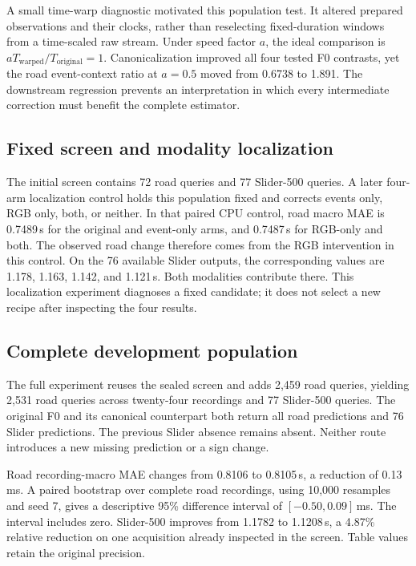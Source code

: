 A small time-warp diagnostic motivated this population test. It altered prepared observations and their clocks, rather than reselecting fixed-duration windows from a time-scaled raw stream. Under speed factor $a$, the ideal comparison is $aT_{\mathrm{warped}}/T_{\mathrm{original}}=1$. Canonicalization improved all four tested F0 contrasts, yet the road event-context ratio at $a=0.5$ moved from 0.6738 to 1.891. The downstream regression prevents an interpretation in which every intermediate correction must benefit the complete estimator. 

\subsection{Fixed screen and modality localization}
The initial screen contains 72 road queries and 77 Slider-500 queries. A later four-arm localization control holds this population fixed and corrects events only, RGB only, both, or neither. In that paired CPU control, road macro MAE is 0.7489\,s for the original and event-only arms, and 0.7487\,s for RGB-only and both. The observed road change therefore comes from the RGB intervention in this control. On the 76 available Slider outputs, the corresponding values are 1.178, 1.163, 1.142, and 1.121\,s. Both modalities contribute there. This localization experiment diagnoses a fixed candidate; it does not select a new recipe after inspecting the four results. 

\subsection{Complete development population}
\EvidenceCanonicalTable
The full experiment reuses the sealed screen and adds 2,459 road queries, yielding 2,531 road queries across twenty-four recordings and 77 Slider-500 queries. The original F0 and its canonical counterpart both return all road predictions and 76 Slider predictions. The previous Slider absence remains absent. Neither route introduces a new missing prediction or a sign change. 

Road recording-macro MAE changes from 0.8106 to 0.8105\,s, a reduction of 0.13\,ms. A paired bootstrap over complete road recordings, using 10,000 resamples and seed 7, gives a descriptive 95\% difference interval of $[-0.50,0.09]$\,ms. The interval includes zero. Slider-500 improves from 1.1782 to 1.1208\,s, a 4.87\% relative reduction on one acquisition already inspected in the screen. Table values retain the original precision.

